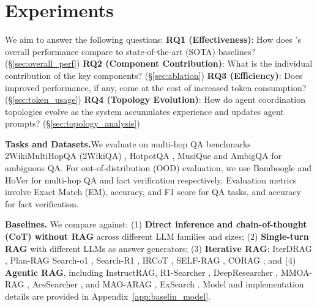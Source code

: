\vspace{-8pt}
\section{Experiments}
\label{sec:exp}
\vspace{-10pt}
We aim to answer the following questions: \textbf{RQ1 (Effectiveness)}: How does \hero’s overall performance compare to state-of-the-art (SOTA) baselines? (\S \ref{sec:overall_perf}) \textbf{RQ2 (Component Contribution)}:  What is the individual contribution of the key components? (\S\ref{sec:ablation}) \textbf{RQ3 (Efficiency)}: Does improved performance, if any, come at the cost of increased token consumption?(\S\ref{sec:token_usage}) \textbf{RQ4 (Topology Evolution)}: How do agent coordination topologies evolve as the system accumulates experience and updates agent prompts? (\S\ref{sec:topology_analysis})



\textbf{Tasks and Datasets.}We evaluate \hero on multi-hop QA benchmarks 2WikiMultiHopQA (2WikiQA) \citep{ho-etal-2020-constructing}, HotpotQA \citep{yang2018hotpotqa}, MusiQue \citep{trivedi2021musique} and AmbigQA \citep{min-etal-2020-ambigqa} for ambiguous QA. For out-of-distribution (OOD) evaluation, we use Bamboogle \citep{press-etal-2023-measuring} and HoVer \citep{jiang2020hover} for multi-hop QA and fact verification respectively. Evaluation metrics involve Exact Match (EM), accuracy, and F1 score for QA tasks, and accuracy for fact verification.

\textbf{Baselines.}
We compare \hero against:
(1) \textbf{Direct inference and chain-of-thought (CoT) without RAG} across different LLM families and sizes;
(2) \textbf{Single-turn RAG} with different LLMs as answer generators; (3) \textbf{Iterative RAG}: IterDRAG \citep{yue2024inference}, Plan-RAG \citep{verma2024plan}
Search-o1 \citep{li2025search}, Search-R1 \citep{jin2025search}, IRCoT \citep{trivedi-etal-2023-interleaving}, SELF-RAG \citep{asai2023self}, CORAG \citep{wang2025chain}; and (4) \textbf{Agentic RAG}, including InstructRAG, R1-Searcher \citep{song2025r1old},  DeepResearcher \citep{zheng-etal-2025-deepresearcher}, MMOA-RAG \citep{chen2025mao}, AceSearcher \citep{xu2025acesearcher} , and MAO-ARAG \citep{chen2025mao}, ExSearch \citep{shi2025iterative}.
Model and implementation details are provided in Appendix~\ref{app:baselin_model}.



